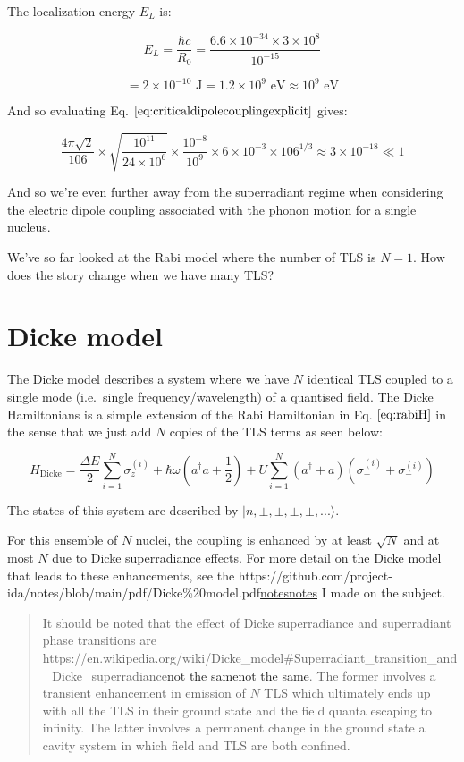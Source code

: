 \documentclass[
]{article}
\let\oldhref\href
\renewcommand{\href}[2]{\ifx#1\urlprefix\oldhref{#1}{#2}\else\uline{\oldhref{#1}{#2}}\fi}
\renewcommand{\[}{\begin{equation}}
\renewcommand{\]}{\end{equation}}
\begin{document}
The localization energy \(E_L\) is:

\[
E_L = \frac{\hbar c}{R_0} = \frac{6.6 \times 10^{-34} \times 3 \times 10^8}{10^{-15}}
\]

\[
= 2 \times 10^{-10} \text{ J} = 1.2 \times 10^9 \text{ eV} \approx 10^9 \text{ eV}
\]

And so evaluating Eq. \(\ref{eq:criticaldipolecouplingexplicit}\) gives:

\[
\frac{4 \pi\sqrt{2} }{106} \times \sqrt{\frac{10^{11}}{24\times10^{6}}} \times \frac{10^{-8}}{10^9} \times 6 \times 10^{-3} \times 106^{1/3} \approx 3\times 10^{-18} \ll 1
\label{eq:dipolewithnumbers}
\]

And so we're even further away from the superradiant regime when
considering the electric dipole coupling associated with the phonon
motion for a single nucleus.

We've so far looked at the Rabi model where the number of TLS is
\(N=1\). How does the story change when we have many TLS?

\section{Dicke model}\label{dicke-model}

The Dicke model describes a system where we have \(N\) identical TLS
coupled to a single mode (i.e.~single frequency/wavelength) of a
quantised field. The Dicke Hamiltonians is a simple extension of the
Rabi Hamiltonian in Eq. \(\ref{eq:rabiH}\) in the sense that we just add
\(N\) copies of the TLS terms as seen below:

\[
H_{\text{Dicke}} = \frac{\Delta E}{2} \sum_{i=1}^N \sigma_z^{(i)} +  \hbar\omega\left(a^{\dagger}a +\frac{1}{2}\right) + U \sum_{i=1}^N (a^\dagger + a) (\sigma_+^{(i)} + \sigma_-^{(i)})
\label{eq:dickeH}
\]

The states of this system are described by
\(|n, \pm, \pm, \pm, \pm, ... \rangle\).

For this ensemble of \(N\) nuclei, the coupling is enhanced by at least
\(\sqrt{N}\) and at most \(N\) due to Dicke superradiance effects. For
more detail on the Dicke model that leads to these enhancements, see the
\href{https://github.com/project-ida/notes/blob/main/pdf/Dicke\%20model.pdf}{notes}
I made on the subject.

\begin{quote}
It should be noted that the effect of Dicke superradiance and
superradiant phase transitions are
\href{https://en.wikipedia.org/wiki/Dicke_model\#Superradiant_transition_and_Dicke_superradiance}{not
the same}. The former involves a transient enhancement in emission of
\(N\) TLS which ultimately ends up with all the TLS in their ground
state and the field quanta escaping to infinity. The latter involves a
permanent change in the ground state a cavity system in which field and
TLS are both confined.
\end{quote}
\end{document}
